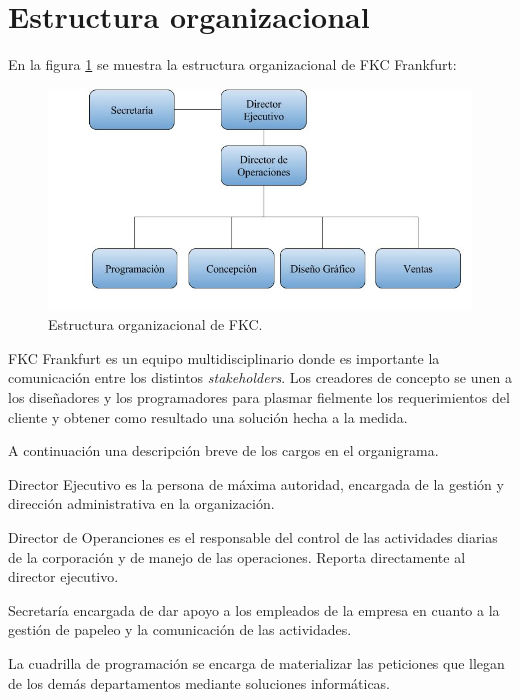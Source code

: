 \section{Estructura organizacional}

En la figura \ref{fig:estructuraFKC} se muestra la estructura organizacional de \gls{FKC} Frankfurt:

\begin{figure}[h]
\begin{center}
	\includegraphics[width=\textwidth]{figuras/estructuraFKC.jpg}
	\caption{Estructura organizacional de \gls{FKC}.} \label{fig:estructuraFKC}
\end{center}
\end{figure}

\gls{FKC} Frankfurt es un equipo multidisciplinario donde es importante la comunicación entre los distintos \emph{stakeholders}. Los creadores de concepto se unen a los diseñadores y los programadores para plasmar fielmente los requerimientos del cliente y obtener como resultado una solución hecha a la medida.

A continuación una descripción breve de los cargos en el organigrama.

Director Ejecutivo es la persona de máxima autoridad, encargada de la gestión y dirección administrativa en la organización.

Director de Operanciones es el responsable del control de las actividades diarias de la corporación y de manejo de las operaciones. Reporta directamente al director ejecutivo.

Secretaría encargada de dar apoyo a los empleados de la empresa en cuanto a la gestión de papeleo y la comunicación de las actividades.

La cuadrilla de programación se encarga de materializar las peticiones que llegan de los demás departamentos mediante soluciones informáticas.

